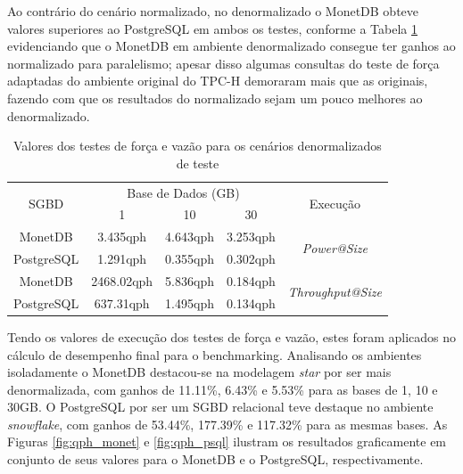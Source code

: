 \documentclass[12pt]{article}
\begin{document}
Ao contrário do cenário normalizado, no denormalizado o MonetDB obteve valores 
superiores ao PostgreSQL em ambos os testes, conforme a Tabela \ref{tab:power-vazao-denormalizado} 
evidenciando que o MonetDB em ambiente denormalizado consegue ter ganhos 
ao normalizado para paralelismo; apesar disso algumas consultas do teste de força 
adaptadas do ambiente original do TPC-H demoraram mais que as originais, fazendo com que 
os resultados do normalizado sejam um pouco melhores ao denormalizado.

\begin{table}[htpb]
    \centering
    \caption{Valores dos testes de força e vazão para os cenários denormalizados de teste}
    \label{tab:power-vazao-denormalizado}
    \begin{tabular}{c|ccc|c}
    \hline
    \multirow{2}{*}{SGBD} & \multicolumn{3}{c|}{Base de Dados (GB)} & \multirow{2}{*}{Execução}       \\
                          & 1             & 10         & 30         &                                 \\ \hline
    MonetDB               & 3.435qph         & 4.643qph      & 3.253qph      & \multirow{2}{*}{\textit{Power@Size}} \\
    PostgreSQL            & 1.291qph         & 0.355qph      & 0.302qph      &                                 \\ \hline
    MonetDB               & 2468.02qph      & 5.836qph      & 0.184qph      & \multirow{2}{*}{\textit{Throughput@Size}} \\
    PostgreSQL            & 637.31qph       & 1.495qph      & 0.134qph      &                                 \\ \hline
    \end{tabular}
    \end{table}

Tendo os valores de execução dos testes de força e vazão, estes foram aplicados 
no cálculo de desempenho final para o benchmarking. Analisando os ambientes isoladamente 
o MonetDB destacou-se na modelagem \textit{star} por ser mais denormalizada, com 
ganhos de 11.11\%, 6.43\% e 5.53\% para as bases de 1, 10 e 30GB.  
O PostgreSQL por ser um SGBD relacional teve destaque no ambiente \textit{snowflake}, 
com ganhos de 53.44\%, 177.39\% e 117.32\% para as mesmas bases. 
As Figuras \ref{fig:qph_monet} e \ref{fig:qph_psql} ilustram os resultados graficamente 
em conjunto de seus valores para o MonetDB e o PostgreSQL, respectivamente. 
\end{document}
